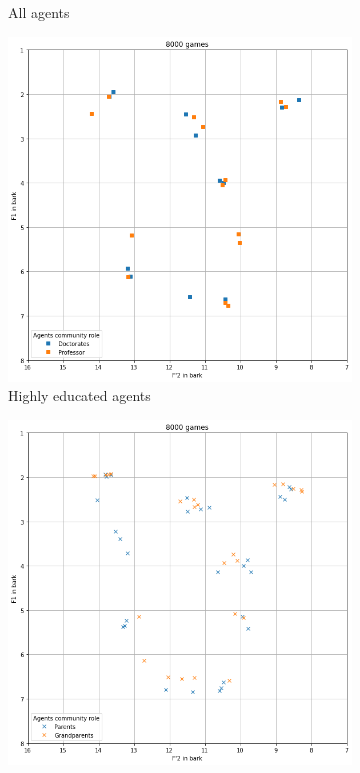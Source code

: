 \begin{figure}[ht]
\begin{subfigure}{.30\textwidth}
        \captionsetup{width=0.9\linewidth}
        \captionsetup{justification=centering}
        \caption{All agents}
    \end{subfigure}
    \hspace{0.5cm}
    \begin{subfigure}{.30\textwidth}
        \centering
        \includegraphics[width=\textwidth]{images/results/single_high.png}
        \captionsetup{width=0.9\linewidth}
        \captionsetup{justification=centering}
        \caption{Highly educated agents}
    \end{subfigure}
    \hspace{0.5cm}
    \begin{subfigure}{.30\textwidth}
        \centering
        \includegraphics[width=\textwidth]{images/results/single_regular.png}

\end{subfigure}
\end{figure}
